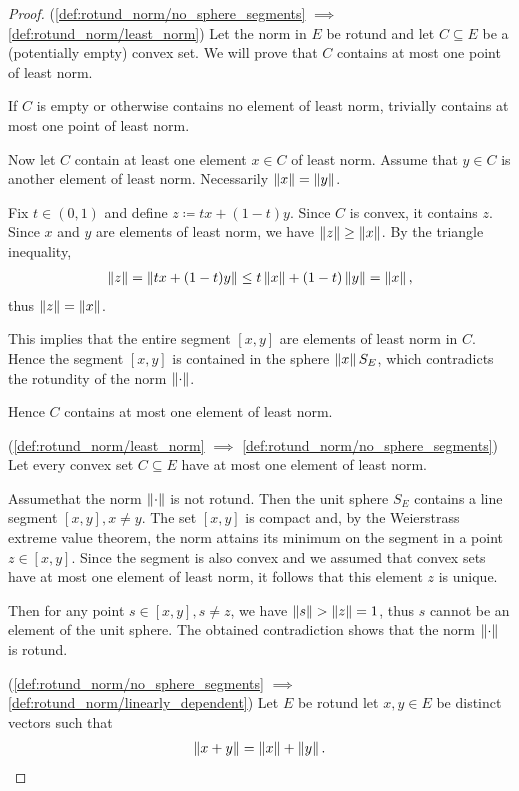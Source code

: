 \begin{proof}
  (\ref{def:rotund_norm/no_sphere_segments} $\implies$ \ref{def:rotund_norm/least_norm}) Let the norm in $E$ be rotund and let $C \subseteq E$ be a (potentially empty) convex set. We will prove that $C$ contains at most one point of least norm.

  If $C$ is empty or otherwise contains no element of least norm, trivially contains at most one point of least norm.

  Now let $C$ contain at least one element $x \in C$ of least norm. Assume that $y \in C$ is another element of least norm. Necessarily $\left\Vert x \right\Vert = \left\Vert y \right\Vert$.

  Fix $t \in (0, 1)$ and define $z \coloneqq tx + (1-t)y$. Since $C$ is convex, it contains $z$. Since $x$ and $y$ are elements of least norm, we have $\left\Vert z \right\Vert \geq \left\Vert x \right\Vert$. By the triangle inequality,
  \begin{align*}
    \left\Vert z \right\Vert
    =
    \left\Vert tx + (1-t)y \right\Vert
    \leq
    t \left\Vert x \right\Vert + (1-t) \left\Vert y \right\Vert
    =
    \left\Vert x \right\Vert,
  \end{align*}
  thus $\left\Vert z \right\Vert = \left\Vert x \right\Vert$.

  This implies that the entire segment $[x, y]$ are elements of least norm in $C$. Hence the segment $[x, y]$ is contained in the sphere $\left\Vert x \right\Vert S_E$, which contradicts the rotundity of the norm $\left\Vert \cdot \right\Vert$.

  Hence $C$ contains at most one element of least norm.

  (\ref{def:rotund_norm/least_norm} $\implies$ \ref{def:rotund_norm/no_sphere_segments}) Let every convex set $C \subseteq E$ have at most one element of least norm.

  Assume\LEM that the norm $\left\Vert \cdot \right\Vert$ is not rotund. Then the unit sphere $S_E$ contains a line segment $[x, y], x \neq y$. The set $[x, y]$ is compact and, by the Weierstrass extreme value theorem, the norm attains its minimum on the segment in a point $z \in [x, y]$. Since the segment is also convex and we assumed that convex sets have at most one element of least norm, it follows that this element $z$ is unique.

  Then for any point $s \in [x, y], s \neq z$, we have $\left\Vert s \right\Vert > \left\Vert z \right\Vert = 1$, thus $s$ cannot be an element of the unit sphere. The obtained contradiction shows that the norm $\left\Vert \cdot \right\Vert$ is rotund.

  (\ref{def:rotund_norm/no_sphere_segments} $\implies$ \ref{def:rotund_norm/linearly_dependent}) Let $E$ be rotund let $x, y \in E$ be distinct vectors such that
  \begin{align}\label{def:rotund_norm/linearly_dependent/assumption}
    \left\Vert x + y \right\Vert = \left\Vert x \right\Vert + \left\Vert y \right\Vert.
  \end{align}


\end{proof}
